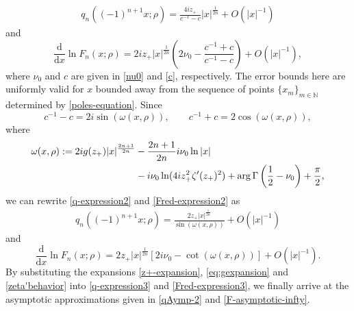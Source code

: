 \documentclass[11pt,a4paper]{article}
\numberwithin{equation}{section}
\def\arg {\mathop{\rm arg}\nolimits}
\begin{document}
\begin{align}\label{q-expression2}
q_{n}((-1)^{n+1}x;\rho)=\frac{4iz_+}{c^{-1}-c}|x|^{\frac{1}{2n}}
+O\left(|x|^{-1}\right)
\end{align}
and
\begin{equation}\label{Fred-expression2}
\frac{\mathrm{d}}{\mathrm{d}x}\ln F_n(x;\rho)=2iz_+|x|^{\frac{1}{2n}}
\left(2\nu_0-\frac{c^{-1}+c}{c^{-1}-c}\right)
+O\left(|x|^{-1}\right),
\end{equation}
where $\nu_0$ and $c$ are given in \eqref{nu0} and \eqref{c}, respectively.  The error bounds here are uniformly valid for $x$ bounded away from the sequence of points $\{x_m\}_{m\in\mathbb{N}}$ determined by \eqref{poles-equation}. Since
\begin{equation}
c^{-1}-c=2i\sin(\omega(x,\rho)), \qquad  c^{-1}+c=2\cos(\omega(x,\rho)),
\end{equation}
where
\begin{align}\label{omega}
\omega(x,\rho):=2ig(z_+)|x|^{\frac{2n+1}{2n}}&-\frac{2n+1}{2n}i\nu_0\ln|x|\nonumber\\
&-i\nu_0\ln(4iz_+^2\zeta'(z_+)^2)+\arg\Gamma\left(\frac{1}{2}-\nu_0\right)
+\frac{\pi}{2},
\end{align}
we can rewrite \eqref{q-expression2} and \eqref{Fred-expression2} as
\begin{align}\label{q-expression3}
q_{n}((-1)^{n+1}x;\rho)=\frac{2z_+|x|^{\frac{1}{2n}}}{\sin(\omega(x,\rho))}
+O\left(|x|^{-1}\right)
\end{align}
and
\begin{equation}\label{Fred-expression3}
\frac{\mathrm{d}}{\mathrm{d}x}\ln F_n(x;\rho)=2z_+|x|^{\frac{1}{2n}}
[2i\nu_0-\cot(\omega(x,\rho))]
+O\left(|x|^{-1}\right).
\end{equation}
By substituting the expansions \eqref{z+-expansion}, \eqref{eq:gexpansion} and \eqref{zeta'behavior} into \eqref{q-expression3} and \eqref{Fred-expression3}, we finally arrive at the asymptotic approximations given in  \eqref{qAymp-2} and \eqref{F-asymptotic-infty}.
\end{document}
